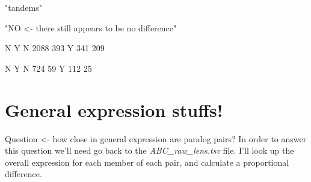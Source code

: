 \documentclass{article}
\begin{document}
\begin{Schunk}
\begin{Soutput}
\end{Soutput}
\begin{Soutput}
[1] "tandems"
\end{Soutput}
\begin{Soutput}
[1] "NO  <- there still appears to be no difference"
\end{Soutput}
\begin{Soutput}
       N    Y
  N 2088  393
  Y  341  209
\end{Soutput}
\begin{Soutput}
      N   Y
  N 724  59
  Y 112  25
\end{Soutput}
\end{Schunk}

\section*{General expression stuffs!}

Question <- how close in general expression are paralog pairs? In order to answer this question we'll need go back to the \textit{ABC\_raw\_lens.tsv} file. I'll look up the overall expression for each member of each pair, and calculate a proportional difference.
\end{document}
